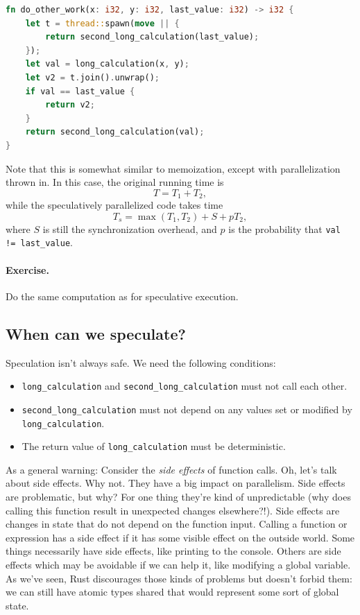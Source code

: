 \documentclass[a4paper]{report}
\begin{document}
\begin{lstlisting}[language=Rust]
fn do_other_work(x: i32, y: i32, last_value: i32) -> i32 {
    let t = thread::spawn(move || {
        return second_long_calculation(last_value);
    });
    let val = long_calculation(x, y);
    let v2 = t.join().unwrap();
    if val == last_value {
        return v2;
    }
    return second_long_calculation(val);
}
\end{lstlisting}

Note that this is somewhat similar to memoization, except with 
parallelization thrown in. In this case, the original running time is
\[ T = T_1 + T_2, \]
while the speculatively parallelized code takes time
\[ T_s = \max(T_1, T_2) + S + pT_2,\]
where $S$ is still the synchronization overhead, and $p$ is the probability that
\verb+val != last_value+.

\paragraph{Exercise.} Do the same computation as for speculative execution.

\subsection*{When can we speculate?}
Speculation isn't always safe. We need the following conditions:
  \begin{itemize}
    \item {\tt long\_calculation} and {\tt second\_long\_calculation} must not call
      each other.
    \item {\tt second\_long\_calculation} must not depend on
      any values set or modified by {\tt long\_calculation}.
    \item The return value of {\tt long\_calculation} must be deterministic.
  \end{itemize}

As a general warning: Consider the \emph{side effects} of function calls. Oh, let's talk about side effects. Why not. They have a big impact on parallelism. Side effects are problematic, but why? For one thing they're kind of unpredictable (why does calling this function result in unexpected changes elsewhere?!). Side effects are changes in state that do not depend on the function input. Calling a function or expression has a side effect if it has some visible effect on the outside world. Some things necessarily have side effects, like printing to the console. Others are side effects which may be avoidable if we can help it, like modifying a global variable. As we've seen, Rust discourages those kinds of problems but doesn't forbid them: we can still have atomic types shared that would represent some sort of global state.
\end{document}
